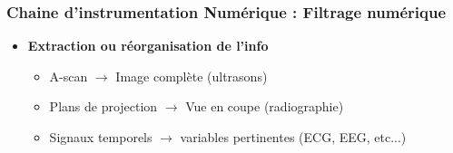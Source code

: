 \documentclass{beamer}
\begin{document}
\begin{frame}
\frametitle{Chaine d'instrumentation Numérique : Filtrage numérique}
\begin{center}
\end{center}
\vspace{0.1cm}
\begin{itemize}
\item \textbf{Extraction ou réorganisation de l'info}
\vspace{0.2cm}
\begin{itemize}
\item A-scan $\rightarrow$ Image complète (ultrasons) 
\vspace{0.2cm}
\item Plans de projection $\rightarrow$ Vue en coupe (radiographie)
\vspace{0.2cm}
\item Signaux temporels $\rightarrow$ variables pertinentes (ECG, EEG, etc...)
\end{itemize}
\vspace{0.2cm}
\end{itemize}
\end{frame}
\end{document}
